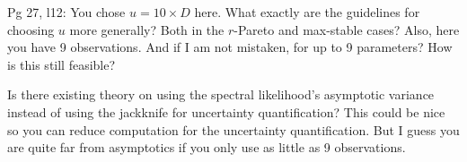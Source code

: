 \documentclass[12pt
]{article}
\begin{document}
\begin{Comments}
Pg 27, l12: You chose $u=10\times D$ here. What exactly are the guidelines for choosing $u$ more generally? Both in the $r$-Pareto and max-stable cases? Also, here you have 9 observations. And if I am not mistaken, for up to 9 parameters? How is this still feasible?
\end{Comments}

\begin{Res}
\end{Res}

\begin{Comments}
Is there existing theory on using the spectral likelihood's asymptotic variance instead of using the jackknife for uncertainty quantification? This could be nice so you can reduce computation for the uncertainty quantification. But I guess you are quite far from asymptotics if you only use as little as 9 observations.
\end{Comments}

\begin{Res}
\end{Res}

\dashline


\end{document}
